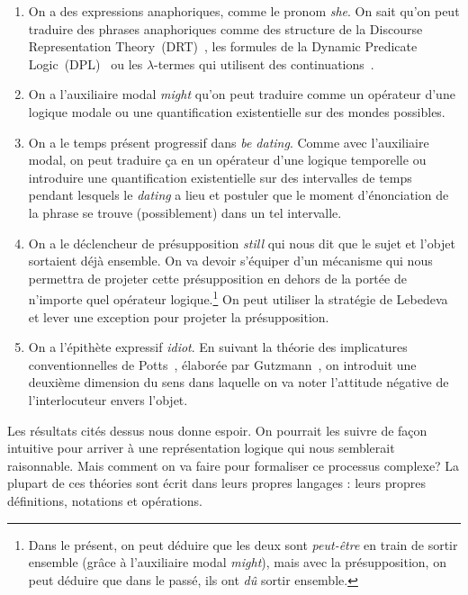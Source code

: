 \begin{enumerate}
  \item \label{item:french-first-feature} On a des expressions anaphoriques, comme
    le pronom \emph{she}. On sait qu'on peut traduire des phrases anaphoriques
    comme des structure de la Discourse Representation
    Theory~(DRT)~\cite{kamp1993discourse}, les formules de la Dynamic Predicate
    Logic~(DPL)~\cite{groenendijk1991dynamic} ou les $\lambda$-termes qui
    utilisent des continuations~\cite{de2006towards}.
  \item On a l'auxiliaire modal \emph{might} qu'on peut traduire comme un
    opérateur d'une logique modale ou une quantification existentielle sur des
    mondes possibles.
  \item On a le temps présent progressif dans \emph{be dating}. Comme avec
    l'auxiliaire modal, on peut traduire ça en un opérateur d'une logique
    temporelle ou introduire une quantification existentielle sur des
    intervalles de temps pendant lesquels le \emph{dating} a lieu et postuler
    que le moment d'énonciation de la phrase se trouve (possiblement) dans un
    tel intervalle.
  \item On a le déclencheur de présupposition \emph{still} qui nous dit que le
    sujet et l'objet sortaient déjà ensemble. On va devoir s'équiper d'un
    mécanisme qui nous permettra de projeter cette présupposition en dehors de
    la portée de n'importe quel opérateur logique.\footnote{Dans le présent, on
      peut déduire que les deux sont \emph{peut-être} en train de sortir
      ensemble (grâce à l'auxiliaire modal \emph{might}), mais avec la
      présupposition, on peut déduire que dans le passé, ils ont \emph{dû}
      sortir ensemble.} On peut utiliser la stratégie de
    Lebedeva~\cite{lebedeva2012expression} et lever une exception pour projeter
    la présupposition.
  \item \label{item:french-last-feature} On a l'épithète expressif \emph{idiot}.
    En suivant la théorie des implicatures conventionnelles de
    Potts~\cite{potts2005logic}, élaborée par Gutzmann~\cite{gutzmann2015use},
    on introduit une deuxième dimension du sens dans laquelle on va noter
    l'attitude négative de l'interlocuteur envers l'objet.
\end{enumerate}

Les résultats cités dessus nous donne espoir. On pourrait les suivre de façon
intuitive pour arriver à une représentation logique qui nous semblerait
raisonnable. Mais comment on va faire pour formaliser ce processus complexe? La
plupart de ces théories sont écrit dans leurs propres langages : leurs propres
définitions, notations et opérations.

